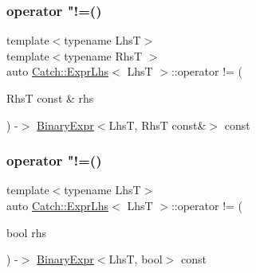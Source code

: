 \subsubsection{\texorpdfstring{operator "!=()}{operator !=()}\hspace{0.1cm}{\footnotesize\ttfamily [1/2]}}
{\footnotesize\ttfamily template$<$typename LhsT$>$ \\
template$<$typename RhsT $>$ \\
auto \mbox{\hyperlink{class_catch_1_1_expr_lhs}{Catch\+::\+Expr\+Lhs}}$<$ LhsT $>$\+::operator != (\begin{DoxyParamCaption}\item[{RhsT const \&}]{rhs }\end{DoxyParamCaption}) -\/$>$ \mbox{\hyperlink{class_catch_1_1_binary_expr}{Binary\+Expr}}$<$LhsT, RhsT const\&$>$ const \hspace{0.3cm}{\ttfamily [inline]}}

\mbox{\label{class_catch_1_1_expr_lhs_a75c4081701b1e57c32ffbdf124fe4297}} 
\subsubsection{\texorpdfstring{operator "!=()}{operator !=()}\hspace{0.1cm}{\footnotesize\ttfamily [2/2]}}
{\footnotesize\ttfamily template$<$typename LhsT$>$ \\
auto \mbox{\hyperlink{class_catch_1_1_expr_lhs}{Catch\+::\+Expr\+Lhs}}$<$ LhsT $>$\+::operator != (\begin{DoxyParamCaption}\item[{bool}]{rhs }\end{DoxyParamCaption}) -\/$>$ \mbox{\hyperlink{class_catch_1_1_binary_expr}{Binary\+Expr}}$<$LhsT, bool$>$ const \hspace{0.3cm}{\ttfamily [inline]}}

\mbox{\label{class_catch_1_1_expr_lhs_ab7d8d931db0dcff46fb1d23114c738c0}} 
